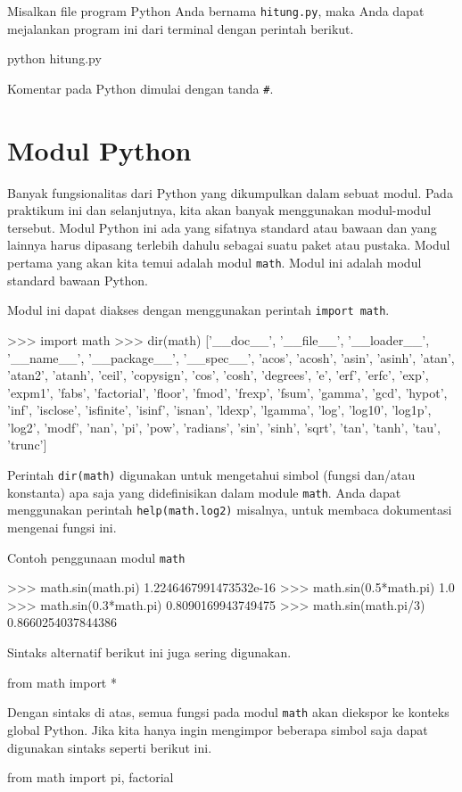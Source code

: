 \documentclass[a4paper,11pt]{extarticle}
\begin{document}
Misalkan file program Python Anda bernama \texttt{hitung.py}, maka Anda dapat
mejalankan program ini dari terminal dengan perintah berikut.
\begin{textcode}
python hitung.py
\end{textcode}

Komentar pada Python dimulai dengan tanda \verb|#|.

\section{Modul Python}

Banyak fungsionalitas dari Python yang dikumpulkan dalam sebuat modul.
Pada praktikum ini dan selanjutnya, kita akan banyak menggunakan modul-modul
tersebut.
Modul Python ini ada yang sifatnya standard atau bawaan dan yang lainnya
harus dipasang terlebih dahulu sebagai suatu paket atau pustaka.
Modul pertama yang akan kita temui adalah modul \texttt{math}. Modul ini
adalah modul standard bawaan Python.

Modul ini dapat diakses dengan menggunakan perintah \texttt{import math}.
\begin{pyconcode}
>>> import math
>>> dir(math)
['__doc__', '__file__', '__loader__', '__name__', '__package__', '__spec__', 'acos', 'acosh', 'asin', 'asinh', 'atan', 'atan2', 'atanh', 'ceil', 'copysign', 'cos', 'cosh', 'degrees', 'e', 'erf', 'erfc', 'exp', 'expm1', 'fabs', 'factorial', 'floor', 'fmod', 'frexp', 'fsum', 'gamma', 'gcd', 'hypot', 'inf', 'isclose', 'isfinite', 'isinf', 'isnan', 'ldexp', 'lgamma', 'log', 'log10', 'log1p', 'log2', 'modf', 'nan', 'pi', 'pow', 'radians', 'sin', 'sinh', 'sqrt', 'tan', 'tanh', 'tau', 'trunc']
\end{pyconcode}

Perintah \texttt{dir(math)} digunakan untuk mengetahui simbol
(fungsi dan/atau konstanta) apa saja yang
didefinisikan dalam module \texttt{math}. Anda dapat menggunakan perintah
\texttt{help(math.log2)} misalnya, untuk membaca dokumentasi mengenai fungsi ini.

Contoh penggunaan modul \texttt{math}
\begin{pyconcode}
>>> math.sin(math.pi)
1.2246467991473532e-16
>>> math.sin(0.5*math.pi)
1.0
>>> math.sin(0.3*math.pi)
0.8090169943749475
>>> math.sin(math.pi/3)
0.8660254037844386
\end{pyconcode}

Sintaks alternatif berikut ini juga sering digunakan.
\begin{pythoncode}
from math import *
\end{pythoncode}
Dengan sintaks di atas, semua fungsi pada modul \texttt{math} akan diekspor ke
konteks global Python.
Jika kita hanya ingin mengimpor beberapa simbol saja dapat digunakan
sintaks seperti berikut ini.
\begin{pythoncode}
from math import pi, factorial
\end{pythoncode}
\end{document}
